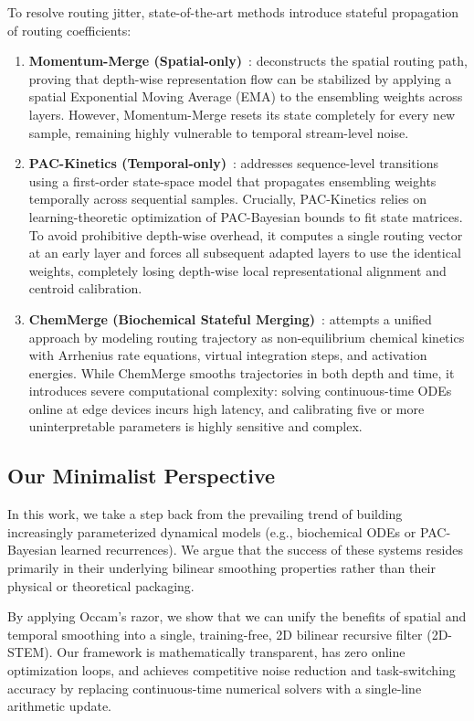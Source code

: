 To resolve routing jitter, state-of-the-art methods introduce stateful propagation of routing coefficients:
\begin{enumerate}
    \item \textbf{Momentum-Merge (Spatial-only)}~\cite{momentummerge}: deconstructs the spatial routing path, proving that depth-wise representation flow can be stabilized by applying a spatial Exponential Moving Average (EMA) to the ensembling weights across layers. However, Momentum-Merge resets its state completely for every new sample, remaining highly vulnerable to temporal stream-level noise.
    \item \textbf{PAC-Kinetics (Temporal-only)}~\cite{pac_kinetics}: addresses sequence-level transitions using a first-order state-space model that propagates ensembling weights temporally across sequential samples. Crucially, PAC-Kinetics relies on learning-theoretic optimization of PAC-Bayesian bounds to fit state matrices. To avoid prohibitive depth-wise overhead, it computes a single routing vector at an early layer and forces all subsequent adapted layers to use the identical weights, completely losing depth-wise local representational alignment and centroid calibration.
    \item \textbf{ChemMerge (Biochemical Stateful Merging)}~\cite{chemmerge}: attempts a unified approach by modeling routing trajectory as non-equilibrium chemical kinetics with Arrhenius rate equations, virtual integration steps, and activation energies. While ChemMerge smooths trajectories in both depth and time, it introduces severe computational complexity: solving continuous-time ODEs online at edge devices incurs high latency, and calibrating five or more uninterpretable parameters is highly sensitive and complex.
\end{enumerate}

\subsection{Our Minimalist Perspective}
In this work, we take a step back from the prevailing trend of building increasingly parameterized dynamical models (e.g., biochemical ODEs or PAC-Bayesian learned recurrences). We argue that the success of these systems resides primarily in their underlying bilinear smoothing properties rather than their physical or theoretical packaging. 

By applying Occam's razor, we show that we can unify the benefits of spatial and temporal smoothing into a single, training-free, 2D bilinear recursive filter (2D-STEM). Our framework is mathematically transparent, has zero online optimization loops, and achieves competitive noise reduction and task-switching accuracy by replacing continuous-time numerical solvers with a single-line arithmetic update.
